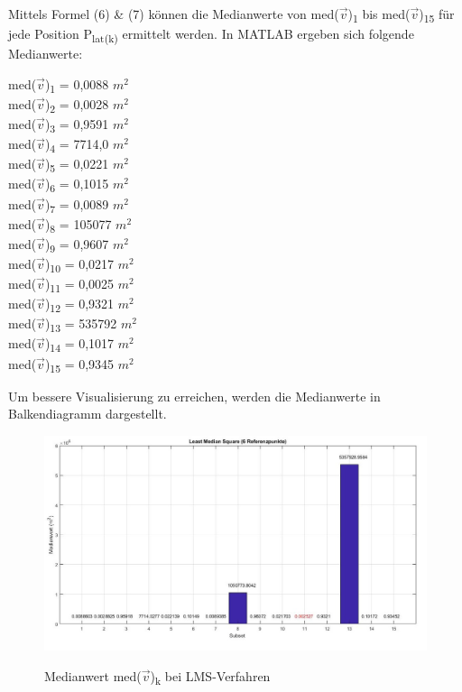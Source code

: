 \noindent
Mittels Formel (6) \& (7) können die Medianwerte von med($\vec{v}$)\textsubscript{1} bis med($\vec{v}$)\textsubscript{15} für jede Position P\textsubscript{lat(k)} ermittelt werden. In MATLAB ergeben sich folgende Medianwerte:
\begin{flushleft}
med($\vec{v}$)\textsubscript{1} = 0,0088 $m^2$\\
med($\vec{v}$)\textsubscript{2} = 0,0028 $m^2$\\
med($\vec{v}$)\textsubscript{3} = 0,9591 $m^2$\\
med($\vec{v}$)\textsubscript{4} = 7714,0 $m^2$\\
med($\vec{v}$)\textsubscript{5} = 0,0221 $m^2$\\
med($\vec{v}$)\textsubscript{6} = 0,1015 $m^2$\\
med($\vec{v}$)\textsubscript{7} = 0,0089 $m^2$\\
med($\vec{v}$)\textsubscript{8} = 105077 $m^2$\\
med($\vec{v}$)\textsubscript{9} = 0,9607 $m^2$\\
med($\vec{v}$)\textsubscript{10} = 0,0217 $m^2$\\
med($\vec{v}$)\textsubscript{11} = 0,0025 $m^2$\\
med($\vec{v}$)\textsubscript{12} = 0,9321 $m^2$\\
med($\vec{v}$)\textsubscript{13} = 535792 $m^2$\\
med($\vec{v}$)\textsubscript{14} = 0,1017 $m^2$\\
med($\vec{v}$)\textsubscript{15} = 0,9345 $m^2$
\end{flushleft}
\noindent
Um bessere Visualisierung zu erreichen, werden die Medianwerte in Balkendiagramm dargestellt.
\begin{figure}[H]
	\centering
	\includegraphics[scale=0.40]{img/LMS_Medianwert.jpg}\\
	\caption{Medianwert med($\vec{v}$)\textsubscript{k} bei LMS-Verfahren }
\end{figure}

